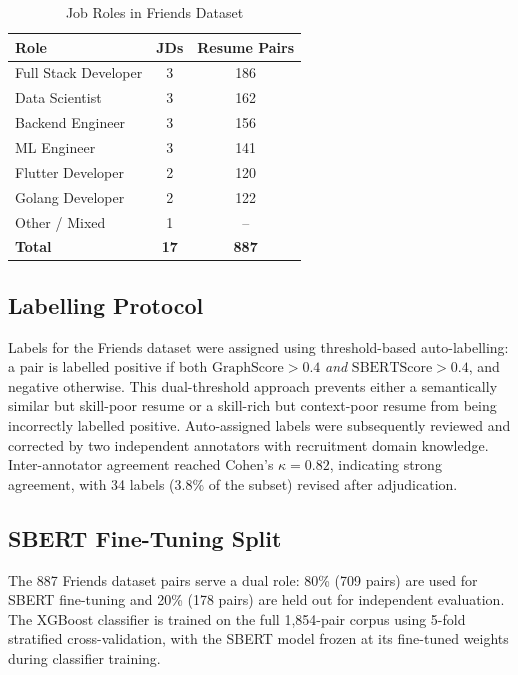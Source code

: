 \documentclass[conference]{IEEEtran}
\begin{document}
\begin{table}[htbp]
\caption{Job Roles in Friends Dataset}
\label{tab:friends_roles}
\centering
\begin{tabular}{lcc}
\toprule
\textbf{Role} & \textbf{JDs} & \textbf{Resume Pairs} \\
\midrule
Full Stack Developer   & 3 & 186 \\
Data Scientist         & 3 & 162 \\
Backend Engineer       & 3 & 156 \\
ML Engineer            & 3 & 141 \\
Flutter Developer      & 2 & 120 \\
Golang Developer       & 2 & 122 \\
Other / Mixed          & 1 &  --  \\
\midrule
\textbf{Total}         & \textbf{17} & \textbf{887} \\
\bottomrule
\end{tabular}
\end{table}

\subsection{Labelling Protocol}
Labels for the Friends dataset were assigned using threshold-based
auto-labelling: a pair is labelled positive if both
$\text{GraphScore} > 0.4$ \textit{and} $\text{SBERTScore} > 0.4$, and
negative otherwise. This dual-threshold approach prevents either a
semantically similar but skill-poor resume or a skill-rich but context-poor
resume from being incorrectly labelled positive. Auto-assigned labels were
subsequently reviewed and corrected by two independent annotators with
recruitment domain knowledge. Inter-annotator agreement reached
Cohen's $\kappa = 0.82$, indicating strong agreement, with 34 labels
(3.8\% of the subset) revised after adjudication.

\subsection{SBERT Fine-Tuning Split}
The 887 Friends dataset pairs serve a dual role: 80\% (709 pairs) are used
for SBERT fine-tuning and 20\% (178 pairs) are held out for independent
evaluation. The XGBoost classifier is trained on the full 1,854-pair corpus
using 5-fold stratified cross-validation, with the SBERT model frozen at its
fine-tuned weights during classifier training.

\end{document}

